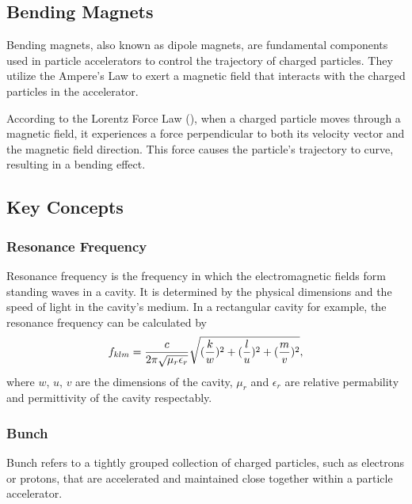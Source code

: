 \documentclass[a4paper,oneside,12pt]{report}
\numberwithin{equation}{chapter}
\begin{document}
\subsection{Bending Magnets}
Bending magnets, also known as dipole magnets, are fundamental components used in particle accelerators to control the trajectory of charged particles. 
They utilize the Ampere's Law to exert a magnetic field that interacts with the charged particles in the accelerator. 

According to the Lorentz Force Law (), when a charged particle moves through a magnetic field, it experiences a force perpendicular to both its velocity 
vector and the magnetic field direction. This force causes the particle's trajectory to curve, resulting in a bending effect.


\subsection{Key Concepts}

\subsubsection{\hspace{4pt}Resonance Frequency}\hspace{4pt}
Resonance frequency is the frequency in which the electromagnetic fields form standing waves in a cavity.
It is determined by the physical dimensions and the speed of light in the cavity's medium. 
In a rectangular cavity for example, the resonance frequency can be calculated by
\vspace{-10pt}\begin{equation}
    f_{klm} = \frac{c}{2\pi \sqrt{\mu_r \epsilon_r}} \sqrt{(\frac{k}{w})^2 + (\frac{l}{u})^2 + (\frac{m}{v})^2}  ,
    \label{eq:f_r_rec}
\vspace{-10pt}\end{equation}
where $w$, $u$, $v$ are the dimensions of the cavity, $\mu_r$ and $\epsilon_r$ are relative permability and permittivity of the cavity respectably.

\subsubsection{\hspace{4pt}Bunch}\hspace{4pt}
Bunch refers to a tightly grouped collection of charged particles, such as electrons or protons, that are accelerated and maintained close together within a particle accelerator.
\end{document}
